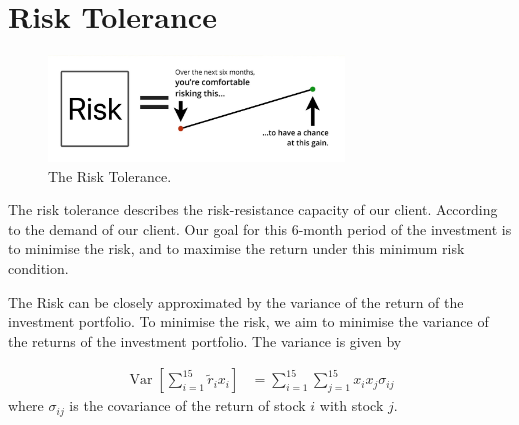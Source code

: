 
\section{Risk Tolerance}

\begin{figure}[!h]
\centering
\includegraphics[width=0.7\textwidth]{./Figures/Tolerance.PNG}
\caption{The Risk Tolerance.}
\end{figure}

The risk tolerance describes the risk-resistance capacity of our client. According to the demand of our client. Our goal for this 6-month period of the investment is to minimise the risk, and to maximise the return under this minimum risk condition.

The Risk can be closely approximated by the variance of the return of the investment portfolio. To minimise the risk, we aim to minimise the variance of the returns of the investment portfolio. The variance is given by 

$$
\begin{aligned}
\operatorname{Var}\left[\sum_{i=1}^{15} \tilde{r}_{i} x_{i}\right] 
&=\sum_{i=1}^{15} \sum_{j=1}^{15} x_{i} x_{j} \sigma_{i j}
\end{aligned}
$$
where $\sigma_{i j}$ is the covariance of the return of stock $i$ with stock $j$.



